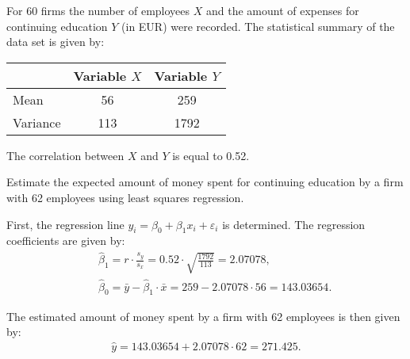 
\begin{question}
For 60 firms the number of employees $X$ and the amount of
expenses for continuing education $Y$ (in EUR) were recorded. The
statistical summary of the data set is given by:

\begin{center}
\begin{tabular}{|l|cc|} \hline
& Variable $X$ & Variable $Y$ \\ \hline
Mean & 56  & 259  \\
Variance & 113  & 1792 \\ \hline
\end{tabular}
\end{center}

The correlation between $X$ and $Y$ is equal to 0.52.

Estimate the expected amount of money spent for continuing education
by a firm with 62 employees using least squares regression.
\end{question}


\begin{solution}
First, the regression line $y_i = \beta_0 + \beta_1 x_i +
\varepsilon_i$ is determined.  The regression coefficients are given by:
\begin{eqnarray*}
&& \hat \beta_1 = r \cdot \frac{s_y}{s_x} = 
0.52 \cdot \sqrt{\frac{1792}{113}} = 2.07078, \\
&& \hat \beta_0 = \bar y - \hat \beta_1 \cdot \bar x = 
259 - 2.07078 \cdot 56 = 143.03654.
\end{eqnarray*}

The estimated amount of money spent by a firm with
62 employees is then given by:
\begin{eqnarray*}
\hat y = 143.03654 + 2.07078 \cdot 62 = 271.425.
\end{eqnarray*}
\end{solution}

